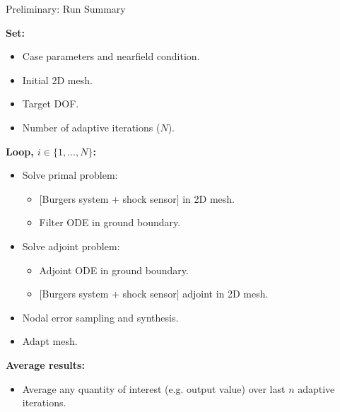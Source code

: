 \documentclass{beamer}
\newcounter{sectionframecount}
\begin{document}

\begin{frame}[t]{Preliminary: Run Summary}
  \vspace{-10pt}
  \begin{enumerate}
  \item \textbf{Set:}
    \begin{itemize}
      \item Case parameters and nearfield condition.
      \item Initial 2D mesh.
      \item Target DOF.
      \item Number of adaptive iterations ($N$).
    \end{itemize}
  {
  \item \textbf{Loop, $i \in \{1,...,N\}$:}
  \begin{itemize}
    \item Solve primal problem:
    \begin{itemize}
      \item $[$Burgers system + shock sensor$]$ in 2D mesh.
      \item Filter ODE in ground boundary.
    \end{itemize}
    \item Solve adjoint problem:
    \begin{itemize}
      \item Adjoint ODE in ground boundary.
      \item $[$Burgers system + shock sensor$]$ adjoint in 2D mesh.
    \end{itemize}
    \item Nodal error sampling and synthesis.
    \item Adapt mesh.
  \end{itemize}
  }
  {
  \item \textbf{Average results:}
  \begin{itemize}
    \item Average any quantity of interest (e.g. output value) over last $n$ adaptive iterations.
  \end{itemize}
  }
\end{enumerate}

\end{frame}
\end{document}
